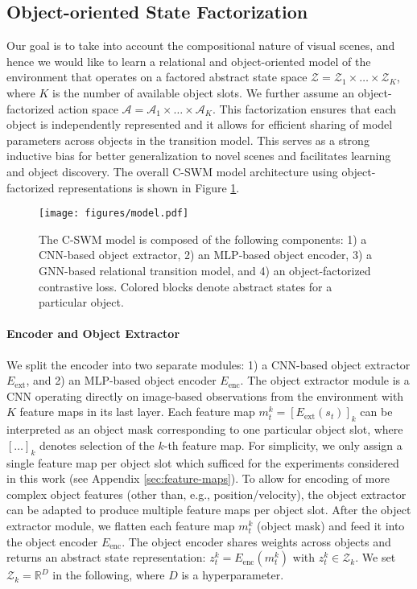 \documentclass{article} %
\begin{document}
\subsection{Object-oriented State Factorization} \label{sec:factorization}
Our goal is to take into account the compositional nature of visual scenes, and hence we would like to learn a relational and object-oriented model of the environment that operates on a factored abstract state space $\mathcal{Z}=\mathcal{Z}_1\times\ldots\times\mathcal{Z}_K$, where $K$ is the number of available object slots. We further assume an object-factorized action space $\mathcal{A}=\mathcal{A}_1\times\ldots\times\mathcal{A}_K$. This factorization ensures that each object is independently represented and it allows for efficient sharing of model parameters across objects in the transition model. This serves as a strong inductive bias for better generalization to novel scenes and facilitates learning and object discovery. The overall C-SWM model architecture using object-factorized representations is shown in Figure \ref{fig:model}.

\begin{figure}[htp!]
  \centering
  \texttt{[image: figures/model.pdf]}
  \caption{The C-SWM model is composed of the following components: 1) a CNN-based object extractor, 2) an MLP-based object encoder, 3) a GNN-based relational transition model, and 4) an object-factorized contrastive loss. Colored blocks denote abstract states for a particular object. \label{fig:model}}
\end{figure}

\paragraph{Encoder and Object Extractor}
We split the encoder into two separate modules: 1) a CNN-based object extractor $E_{\text{ext}}$, and 2) an MLP-based object encoder $E_{\text{enc}}$. The object extractor module is a CNN operating directly on image-based observations from the environment with $K$ feature maps in its last layer. Each feature map $m^k_t = [E_{\text{ext}}(s_t)]_k$ can be interpreted as an object mask corresponding to one particular object slot, where $[\ldots]_k$ denotes selection of the $k$-th feature map. For simplicity, we only assign a single feature map per object slot which sufficed for the experiments considered in this work (see Appendix \ref{sec:feature-maps}). To allow for encoding of more complex object features (other than, e.g., position/velocity), the object extractor can be adapted to produce multiple feature maps per object slot. After the object extractor module, we flatten each feature map $m^k_t$ (object mask) and feed it into the object encoder $E_{\text{enc}}$. The object encoder shares weights across objects and returns an abstract state representation: $z_t^k = E_{\text{enc}}(m_t^k)$ with $z_t^k\in\mathcal{Z}_k$. We set $\mathcal{Z}_k = \mathbb{R}^D$ in the following, where $D$ is a hyperparameter.
\end{document}
